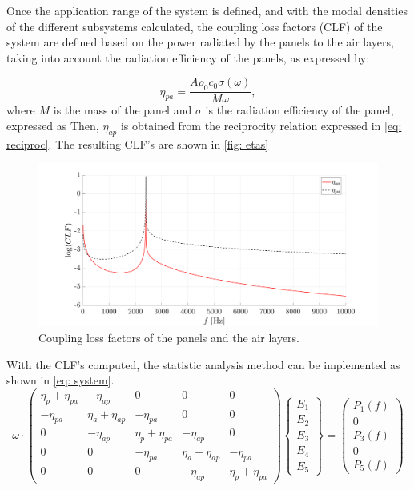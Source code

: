 Once the application range of the system is defined, and with the modal densities of the different subsystems calculated, the coupling loss factors (CLF) of the system are defined based on the power radiated by the panels to the air layers, taking into account the radiation efficiency of the panels, as expressed by:

\begin{equation}
\eta_{p a}=\frac{A \rho_0 c_0 \sigma(\omega)}{M \omega},
\end{equation}
where $M$ is the mass of the panel and $\sigma$ is the radiation efficiency of the panel, expressed as
Then, $\eta_{ap}$ is obtained from the reciprocity relation expressed in \autoref{eq: reciproc}. The resulting CLF's are shown in \autoref{fig: etas}

\begin{figure}[H]
    \centering
    \includegraphics[width=0.9\linewidth]{Figures/etas.png}
    \caption{Coupling loss factors of the panels and the air layers.}
    \label{fig: etas}
\end{figure}

With the CLF's computed, the statistic analysis method can be implemented as shown in \autoref{eq: system}.
\begin{equation}
    \label{eq: system}
    \omega \cdot\left(\begin{array}{ccccc}
    \eta_p+\eta_{p a} & -\eta_{a p} & 0 & 0 & 0 \\
    -\eta_{p a} & \eta_a+\eta_{a p} & -\eta_{p a} & 0 & 0 \\
    0 & -\eta_{a p} & \eta_p+\eta_{p a} & -\eta_{a p} & 0 \\
    0 & 0 & -\eta_{p a} & \eta_a+\eta_{a p} & -\eta_{p a} \\
    0 & 0 & 0 & -\eta_{a p} & \eta_p+\eta_{p a}
    \end{array}\right)\left\{\begin{array}{c}
    E_1 \\
    E_2 \\
    E_3 \\
    E_4 \\
    E_5
    \end{array}\right\}=\left(\begin{array}{c}
    P_1(f) \\
    0 \\
    P_3(f) \\
    0 \\
    P_5(f)
    \end{array}\right)
\end{equation}

